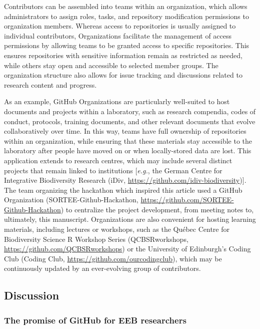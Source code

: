 Contributors can be assembled into teams within an organization, which allows administrators to assign roles, tasks, and repository modification permissions to organization members.
Whereas access to repositories is usually assigned to individual contributors, Organizations facilitate the management of access permissions by allowing teams to be granted access to specific repositories.
This ensures repositories with sensitive information remain as restricted as needed, while others stay open and accessible to selected member groups.
The organization structure also allows for issue tracking and discussions related to research content and progress.

As an example, GitHub Organizations are particularly well-suited to host documents and projects within a laboratory, such as research compendia, codes of conduct, protocols, training documents, and other relevant documents that evolve collaboratively over time.
In this way, teams have full ownership of repositories within an organization, while ensuring that these materials stay accessible to the laboratory after people have moved on or when locally-stored data are lost.
This application extends to research centres, which may include several distinct projects that remain linked to institutions {[}\emph{e.g.}, the German Centre for Integrative Biodiversity Research (iDiv, \url{https://github.com/idiv-biodiversity}){]}.
The team organizing the hackathon which inspired this article used a GitHub Organization (SORTEE-Github-Hackathon, \url{https://github.com/SORTEE-Github-Hackathon}) to centralize the project development, from meeting notes to, ultimately, this manuscript.
Organizations are also convenient for hosting learning materials, including lectures or workshops, such as the Québec Centre for Biodiversity Science R Workshop Series (QCBSRworkshops, \url{https://github.com/QCBSRworkshops}) or the University of Edinburgh's Coding Club (Coding Club, \url{https://github.com/ourcodingclub}), which may be continuously updated by an ever-evolving group of contributors.

\hypertarget{discussion}{%
\subsection{Discussion}\label{discussion}}

\hypertarget{the-promise-of-github-for-eeb-researchers}{%
\subsubsection{The promise of GitHub for EEB researchers}\label{the-promise-of-github-for-eeb-researchers}}

